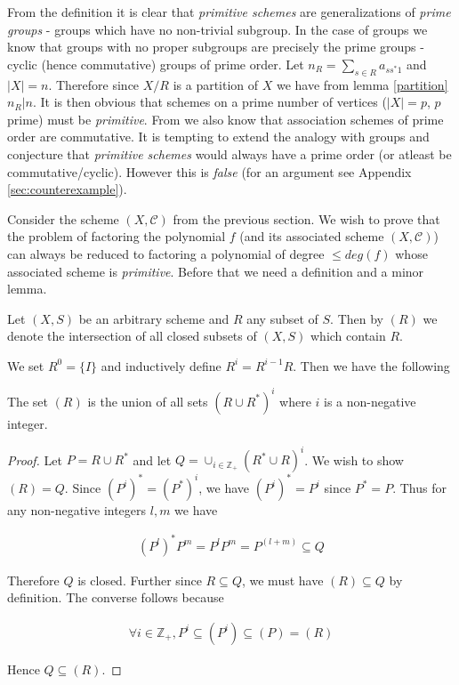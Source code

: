 	
	From the definition it is clear that \emph{primitive schemes} are generalizations of \emph{prime groups} - groups which have no non-trivial subgroup. In the case of groups we know that groups with no proper subgroups
	are precisely the prime groups - cyclic (hence commutative) groups of prime order.	
	Let $n_R=\sum_{s \in R} a_{ss^*1}$ and $|X|=n$. Therefore since $X/R$ is a partition of $X$ we have from lemma \ref{partition}
	$n_R|n$. It is then obvious that schemes on a prime number of vertices ($|X|=p$, $p$ prime) must be \emph{primitive}. From \cite{Hanaki:2006} we also know that association schemes of prime order are commutative. It is 
	tempting to extend the analogy with groups and conjecture that \emph{primitive schemes} would always have a prime order (or atleast be commutative/cyclic). However this is \emph{false} (for an argument see Appendix
	\ref{sec:counterexample}).
	
	Consider the scheme $(X,\mathcal{C})$ from the previous section. We wish to prove that the
	problem of factoring the polynomial $f$ (and its associated scheme $(X,\mathcal{C})$) can always be reduced to factoring a polynomial of degree $\le deg(f)$ whose associated scheme is \emph{primitive}. Before that we
	need a definition and a minor lemma.

 	\begin{definition}
		Let $(X,S)$ be an arbitrary scheme and $R$ any subset of $S$. Then by $(R)$ we denote the intersection of all closed subsets of $(X,S)$ which contain $R$.
	\end{definition}

	We set $R^0 =\{I\}$ and inductively define $R^i=R^{i-1}R$. Then we have the following

	\begin{lemma}
		The set $(R)$ is the union of all sets $(R \cup R^*)^i$ where $i$ is a non-negative integer.
	\end{lemma}

	\begin{proof}
		Let $P=R \cup R^*$ and let $Q = \cup_{i \in \mathbb{Z}_+}(R^*\cup R)^i$. We wish to show $(R)=Q$. Since $(P^i)^*=(P^*)^i$, we have $(P^i)^*=P^i$ since $P^*=P$. Thus for any non-negative integers $l,m$ we have

		\begin{align*}
			(P^l)^*P^m = P^lP^m = P^{(l+m)} \subseteq Q
		\end{align*}

		Therefore $Q$ is closed. Further since $R \subseteq Q$, we must have $(R) \subseteq Q$ by definition. The converse follows because

		\begin{align*}
			\forall i \in \mathbb{Z}_+,P^i \subseteq (P^i) \subseteq (P) = (R)
		\end{align*}

		Hence $Q \subseteq (R)$.
	\end{proof}


